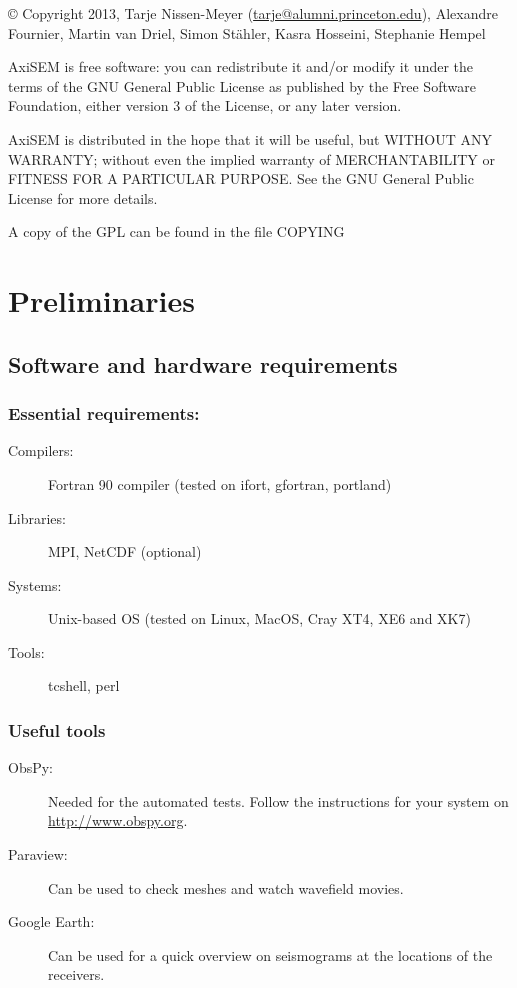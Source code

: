 \documentclass[11pt,letter,fleqn,english,notitlepage]{article}
\begin{document}
\noindent \copyright  \hspace*{0.1cm} 
Copyright 2013, Tarje Nissen-Meyer (\url{tarje@alumni.princeton.edu}), Alexandre Fournier, Martin van Driel, Simon Stähler, Kasra Hosseini, Stephanie Hempel

AxiSEM is free software: you can redistribute it and/or modify it under the terms of the GNU General Public License as published by the Free Software Foundation, either version 3 of the License, or any later version.

AxiSEM is distributed in the hope that it will be useful, but WITHOUT ANY WARRANTY; without even the implied warranty of MERCHANTABILITY or FITNESS FOR A PARTICULAR PURPOSE.  See the GNU General Public License for more details.

A copy of the GPL can be found in the file COPYING

\newpage
\tableofcontents
\newpage

\section{Preliminaries}

\subsection{Software and hardware requirements}

\subsubsection{Essential requirements:} 
\begin{description}
 \item[Compilers:] Fortran 90 compiler (tested on ifort, gfortran, portland)
 \item[Libraries:] MPI, NetCDF (optional)
 \item[Systems:] Unix-based OS (tested on Linux, MacOS, Cray XT4, XE6 and XK7)
 \item[Tools:] tcshell, perl
\end{description}
\subsubsection{Useful tools}
\begin{description}
 \item[ObsPy:] Needed for the automated tests. Follow the instructions for your system on \url{http://www.obspy.org}.
 \item[Paraview:] Can be used to check meshes and watch wavefield movies.
 \item[Google Earth:] Can be used for a quick overview on seismograms at the locations of the receivers.
\end{description}
\end{document}
